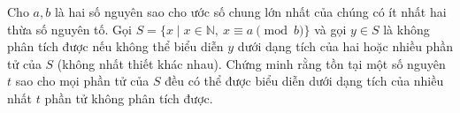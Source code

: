 \ifshowproblem
\begin{problem}\label{example:CHN-2015-TST3-P3}
	Cho $a, b$ là hai số nguyên sao cho ước số chung lớn nhất của chúng có ít nhất hai thừa số nguyên tố.
	Gọi $S = \{ x \mid x \in \mathbb{N},\ x \equiv a \pmod{b} \}$ và gọi $y \in S$ là không phân tích được
	nếu không thể biểu diễn $y$ dưới dạng tích của hai hoặc nhiều phần tử của $S$ (không nhất thiết khác nhau).
	Chứng minh rằng tồn tại một số nguyên $t$ sao cho mọi phần tử của $S$
	đều có thể được biểu diễn dưới dạng tích của nhiều nhất $t$ phần tử không phân tích được.
\end{problem}
\fi

\footnotemark
{}
\fi